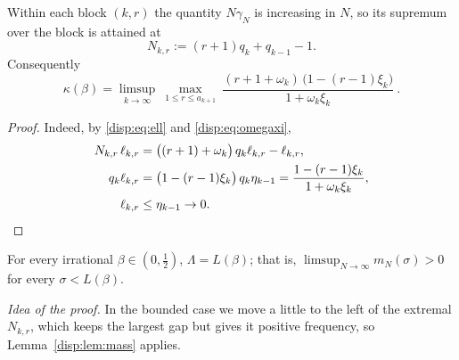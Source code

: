 \begin{lemma}\label{disp:lem:sup}
Within each block $(k,r)$ the quantity $N\gamma_N$ is increasing in $N$, so its supremum over the block is attained at
\[
N_{k,r}:=(r+1)q_k+q_{k-1}-1 .
\]
Consequently
\[
\kappa(\beta)=\limsup_{k\to\infty}\ \max_{1\le r\le a_{k+1}}\ \frac{(r+1+\omega_k)\,\bigl(1-(r-1)\xi_k\bigr)}{1+\omega_k\xi_k}\ .
\]
\end{lemma}
\begin{proof}
Indeed, by \eqref{disp:eq:ell} and \eqref{disp:eq:omegaxi},
\begin{align*}
N_{k,r}\,\ell_{k,r}&=\bigl((r+1)+\omega_k\bigr)\,q_k\ell_{k,r}-\ell_{k,r},\\
q_k\ell_{k,r}&=\bigl(1-(r-1)\xi_k\bigr)\,q_k\eta_{k-1}=\frac{1-(r-1)\xi_k}{1+\omega_k\xi_k},\\
\ell_{k,r}&\le\eta_{k-1}\to0 .\qedhere
\end{align*}
\end{proof}

\begin{proposition}\label{disp:prop:lambda}
For every irrational $\beta\in(0,\frac12)$, $\Lambda=L(\beta)$; that is, $\limsup_{N\to\infty} m_N(\sigma)>0$ for every $\sigma<L(\beta)$.
\end{proposition}
\emph{Idea of the proof.} In the bounded case we move a little to the left of the extremal $N_{k,r}$, which keeps the largest gap but gives it positive frequency, so Lemma~\ref{disp:lem:mass} applies.


